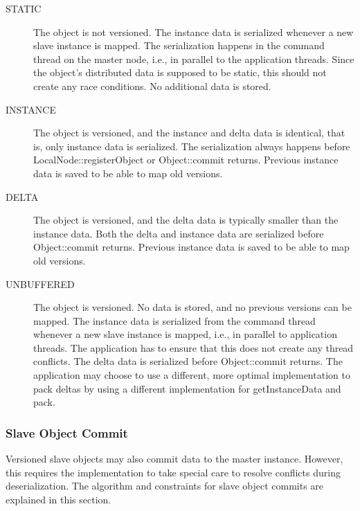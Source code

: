 \documentclass[10pt,a4]{scrartcl}
\begin{document}
\begin{description}
  \item[STATIC] The object is not versioned. The instance data is serialized
    whenever a new slave instance is mapped. The serialization happens in the
    command thread on the master node, i.e., in parallel to the application
    threads. Since the object's distributed data is supposed to be static, this
    should not create any race conditions. No additional data is stored.
  \item[INSTANCE] The object is versioned, and the instance and delta data is
    identical, that is, only instance data is serialized. The serialization
    always happens before \textsf{LocalNode::registerObject} or
    \textsf{Object::commit} returns. Previous instance data is saved to be able
    to map old versions.
  \item[DELTA] The object is versioned, and the delta data is typically smaller
    than the instance data. Both the delta and instance data are serialized
    before \textsf{Object::commit} returns. Previous instance data is saved to
    be able to map old versions.
  \item[UNBUFFERED] The object is versioned. No data is stored, and no previous
    versions can be mapped. The instance data is serialized from the command
    thread whenever a new slave instance is mapped, i.e., in parallel to
    application threads. The application has to ensure that this does not create
    any thread conflicts. The delta data is serialized before
    \textsf{Object::commit} returns. The application may choose to use a
    different, more optimal implementation to pack deltas by using a different
    implementation for \textsf{getInstanceData} and \textsf{pack}.
\end{description}


\subsubsection{\label{sSlaveCommit}Slave Object Commit}

Versioned slave objects may also commit data to the master instance. However,
this requires the implementation to take special care to resolve conflicts
during deserialization. The algorithm and constraints for slave object commits
are explained in this section.
\end{document}

